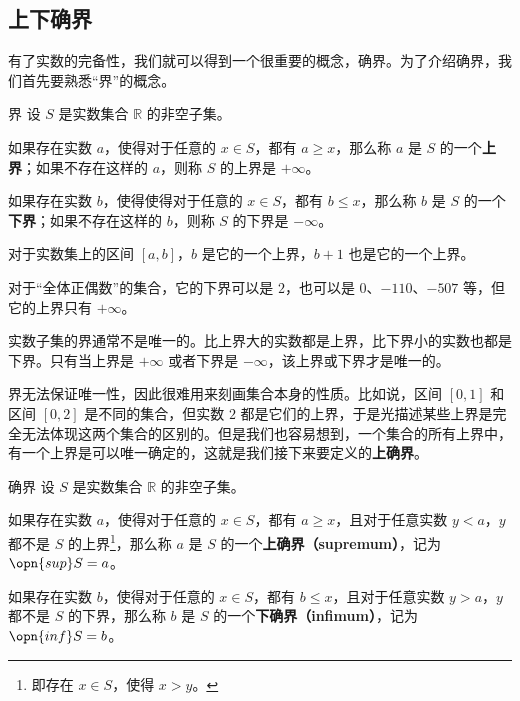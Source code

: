 
\begin{issues}
\issueDraft
\issueTODO
\end{issues}



\subsection{上下确界}

有了实数的完备性，我们就可以得到一个很重要的概念，确界。为了介绍确界，我们首先要熟悉“界”的概念。

\begin{definition}{界}
设 $S$ 是实数集合 $\mathbb{R}$ 的非空子集。

如果存在实数 $a$，使得对于任意的 $x\in S$，都有 $a\geq x$，那么称 $a$ 是 $S$ 的一个\textbf{上界}；如果不存在这样的 $a$，则称 $S$ 的上界是 $+\infty$。

如果存在实数 $b$，使得使得对于任意的 $x\in S$，都有 $b\leq x$，那么称 $b$ 是 $S$ 的一个\textbf{下界}；如果不存在这样的 $b$，则称 $S$ 的下界是 $-\infty$。
\end{definition}

\begin{example}{}
对于实数集上的区间 $[a, b]$，$b$ 是它的一个上界，$b+1$ 也是它的一个上界。

对于“全体正偶数”的集合，它的下界可以是 $2$，也可以是 $0$、$-110$、$-507$ 等，但它的上界只有 $+\infty$。
\end{example}

实数子集的界通常不是唯一的。比上界大的实数都是上界，比下界小的实数也都是下界。只有当上界是 $+\infty$ 或者下界是 $-\infty$，该上界或下界才是唯一的。

界无法保证唯一性，因此很难用来刻画集合本身的性质。比如说，区间 $[0, 1]$ 和区间 $[0, 2]$ 是不同的集合，但实数 $2$ 都是它们的上界，于是光描述某些上界是完全无法体现这两个集合的区别的。但是我们也容易想到，一个集合的所有上界中，有一个上界是可以唯一确定的，这就是我们接下来要定义的\textbf{上确界}。

\begin{definition}{确界}
设 $S$ 是实数集合 $\mathbb{R}$ 的非空子集。

如果存在实数 $a$，使得对于任意的 $x\in S$，都有 $a\geq x$，且对于任意实数 $y<a$，$y$ 都不是 $S$ 的上界\footnote{即存在 $x\in S$，使得 $x>y$。}，那么称 $a$ 是 $S$ 的一个\textbf{上确界（supremum）}，记为 $\opn{sup} S=a$。

如果存在实数 $b$，使得对于任意的 $x\in S$，都有 $b\leq x$，且对于任意实数 $y>a$，$y$ 都不是 $S$ 的下界，那么称 $b$ 是 $S$ 的一个\textbf{下确界（infimum）}，记为 $\opn{inf} S=b$。



\end{definition}


